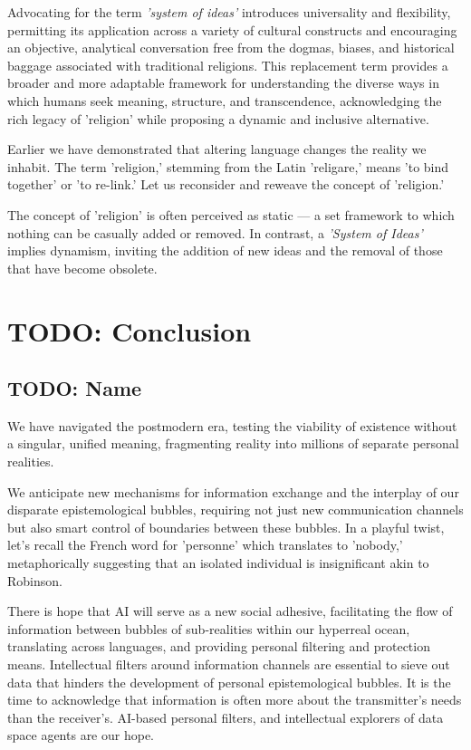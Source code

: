 \documentclass[11pt,a4]{article}
\begin{document}
\par
Advocating for the term \textit{'system of ideas'} introduces universality and flexibility, permitting its application across a variety of cultural constructs and encouraging an objective, analytical conversation free from the dogmas, biases, and historical baggage associated with traditional religions. This replacement term provides a broader and more adaptable framework for understanding the diverse ways in which humans seek meaning, structure, and transcendence, acknowledging the rich legacy of 'religion' while proposing a dynamic and inclusive alternative.

\par
Earlier we have demonstrated that altering language changes the reality we inhabit. The term 'religion,' stemming from the Latin 'religare,' means 'to bind together' or 'to re-link.' Let us reconsider and reweave the concept of 'religion.'

\par
The concept of 'religion' is often perceived as static — a set framework to which nothing can be casually added or removed. In contrast, a \textit{'System of Ideas'} implies dynamism, inviting the addition of new ideas and the removal of those that have become obsolete.



\section{TODO: Conclusion}
    \subsection{TODO: Name}
    We have navigated the postmodern era, testing the viability of existence without a singular, unified meaning, fragmenting reality into millions of separate personal realities.
    \par
    We anticipate new mechanisms for information exchange and the interplay of our disparate epistemological bubbles, requiring not just new communication channels but also smart control of boundaries between these bubbles.
    In a playful twist, let's recall the French word for 'personne' which translates to 'nobody,' metaphorically suggesting that an isolated individual is insignificant akin to Robinson.
    \par
    There is hope that AI will serve as a new social adhesive, facilitating the flow of information between bubbles of sub-realities within our hyperreal ocean, translating across languages, and providing personal filtering and protection means. Intellectual filters around information channels are essential to sieve out data that hinders the development of personal epistemological bubbles. It is the time to acknowledge that information is often more about the transmitter's needs than the receiver's.  AI-based personal filters, and intellectual explorers of data space agents are our hope.
\end{document}
